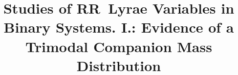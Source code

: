 \documentclass[twocolumn,times]{aastex63}
\begin{document}
\title{Studies of RR~Lyrae Variables in Binary Systems. I.: Evidence of
a Trimodal Companion Mass Distribution}


\end{document}
